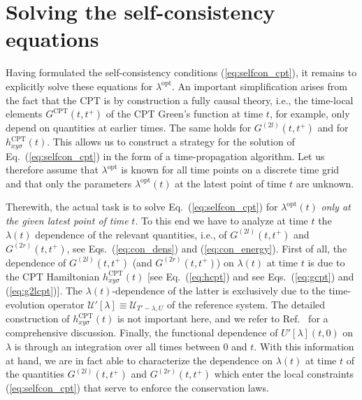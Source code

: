 \documentclass[twocolumn,prb,showpacs,aps,superscriptaddress]{revtex4}
\begin{document}
\section{Solving the self-consistency equations}
\label{sec:solve_for_lambda}

Having formulated the self-consistency conditions (\ref{eq:selfcon_cpt}), it remains to explicitly solve these equations
for $\lambda^\text{opt}$. 
An important simplification arises from the fact that the CPT is by construction a fully causal theory, i.e., 
the time-local elements $G^\text{CPT} (t,t^{+})$ of the CPT Green's function at time $t$, for example, only depend on quantities at earlier times.
The same holds for $G^{(2l)}(t,t^{+})$ and for $h^\text{CPT}_{xy\sigma}(t)$.
This allows us to construct a strategy for the solution of Eq.\ (\ref{eq:selfcon_cpt}) in the form of a time-propagation algorithm. 
Let us therefore assume that $\lambda^\text{opt}$ is known for all time points on a discrete time grid and that only the parameters $\lambda^\text{opt}(t)$ at the latest point of time $t$ are unknown. 

Therewith, the actual task is to solve Eq.\ (\ref{eq:selfcon_cpt}) for $\lambda^\text{opt}(t)$ {\em only at the given latest point of time} $t$. 
To this end we have to analyze at time $t$ the $\lambda(t)$ dependence of the relevant quantities, i.e., 
of $G^{(2l)}(t,t^{+})$ and $G^{(2r)}(t,t^{+})$, see Eqs.\ (\ref{eq:con_dens}) and (\ref{eq:con_energy}).
First of all, the dependence of $G^{(2l)}(t,t^{+})$ (and $G^{(2r)}(t,t^{+})$) on $\lambda(t)$ at time $t$ is due to the CPT Hamiltonian $h^\text{CPT}_{xy\sigma}(t)$ [see Eq.\ (\ref{eq:hcpt}) and see Eqs.\ (\ref{eq:gcpt}) and (\ref{eq:g2lcpt})]. 
The $\lambda(t)$-dependence of the latter is exclusively due to the time-evolution operator $\mathcal{U}'[\lambda]\equiv \mathcal{U}_{T'-\lambda, U}$ of the reference system.
The detailed construction of $h^\text{CPT}_{xy\sigma}(t)$ is not important here, and we refer to Ref.\  for a comprehensive discussion. 
Finally, the functional dependence of $U'[\lambda](t,0)$ on $\lambda$ is through an integration over all times between $0$ and $t$.
With this information at hand, we are in fact able to characterize the dependence on $\lambda(t)$ at time $t$ of the quantities $G^{(2l)}(t,t^{+})$ and $G^{(2r)}(t,t^{+})$ which enter the local constraints (\ref{eq:selfcon_cpt}) that serve to enforce the conservation laws.
\end{document}
